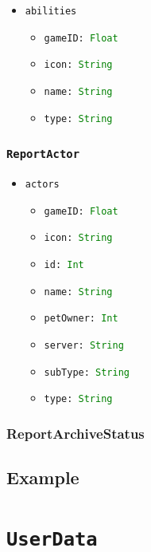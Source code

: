 \documentclass[10pt, a4paper]{memoir}
\numberwithin{equation}{section}
\theoremstyle{plain}
\theoremstyle{defp}
\theoremstyle{dotless}
\theoremstyle{definition}
\theoremstyle{dotless}
\theoremstyle{dotless}
\theoremstyle{defp}
\theoremstyle{defp}
\theoremstyle{be}          %
\theoremstyle{defp}
\newcommand\ttt[1]{\texttt{#1}}
\newcommand\type[1]{\ttt{\textcolor{green}{#1}}}
\begin{document}
\begin{itemize}[noitemsep,topsep=1pt]
\item \ttt{abilities}
\begin{itemize}[itemsep=1pt, topsep=1pt]
\item \ttt{gameID: \type{Float}}
\item \ttt{icon: \type{String}}
\item \ttt{name: \type{String}}
\item \ttt{type: \type{String}}
\end{itemize}
\end{itemize}


\subsubsection{\ttt{ReportActor}}\label{sec:ReportActor}

\begin{itemize}[noitemsep,topsep=1pt]
\item \ttt{actors}
\begin{itemize}[itemsep=1pt,topsep=1pt]
\item \ttt{gameID: \type{Float}}
\item \ttt{icon: \type{String}}
\item \ttt{id: \type{Int}}
\item \ttt{name: \type{String}}
\item \ttt{petOwner: \type{Int}}
\item \ttt{server: \type{String}}
\item \ttt{subType: \type{String}}
\item \ttt{type: \type{String}}
\end{itemize}
\end{itemize}

\subsubsection{ReportArchiveStatus}\label{ReportArchiveStatus}


\subsection{Example}

\newpage

\section{\ttt{UserData}}\label{sec:UserData}
\end{document}
